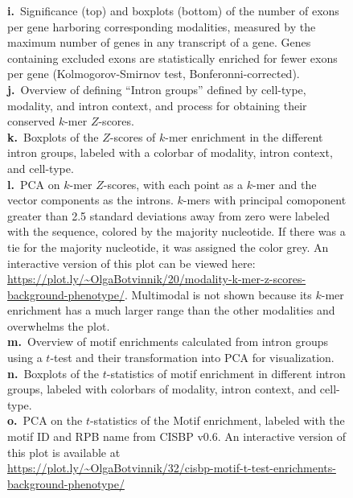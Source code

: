 \begin{figure}[h]
{\textbf{i.}~Significance (top) and boxplots (bottom) of the number of exons per gene harboring corresponding modalities, measured by the maximum number of genes in any transcript of a gene. Genes containing excluded exons are statistically enriched for fewer exons per gene (Kolmogorov-Smirnov test, Bonferonni-corrected).\\
\textbf{j.}~Overview of defining ``Intron groups'' defined by cell-type, modality, and intron context, and process for obtaining their conserved $k$-mer $Z$-scores.\\
\textbf{k.}~Boxplots of the $Z$-scores of $k$-mer enrichment in the different intron groups, labeled with a colorbar of modality, intron context, and cell-type.\\
\textbf{l.}~PCA on $k$-mer $Z$-scores, with each point as a $k$-mer and the vector components as the introns. $k$-mers with principal comoponent greater than 2.5 standard deviations away from zero were labeled with the sequence, colored by the majority nucleotide. If there was a tie for the majority nucleotide, it was assigned the color grey. An interactive version of this plot can be viewed here: \url{https://plot.ly/~OlgaBotvinnik/20/modality-k-mer-z-scores-background-phenotype/}. Multimodal is not shown because its $k$-mer enrichment has a much larger range than the other modalities and overwhelms the plot.\\
\textbf{m.}~Overview of motif enrichments calculated from intron groups using a $t$-test and their transformation into PCA for visualization.\\
\textbf{n.}~Boxplots of the $t$-statistics of motif enrichment in different intron groups, labeled with colorbars of modality, intron context, and cell-type.\\
\textbf{o.}~PCA on the $t$-statistics of the Motif enrichment, labeled with the motif ID and RPB name from CISBP v0.6. An interactive version of this plot is available at\\\url{https://plot.ly/~OlgaBotvinnik/32/cisbp-motif-t-test-enrichments-background-phenotype/}
}
\label{fig:supp_modality_features}

\end{figure}
\clearpage
